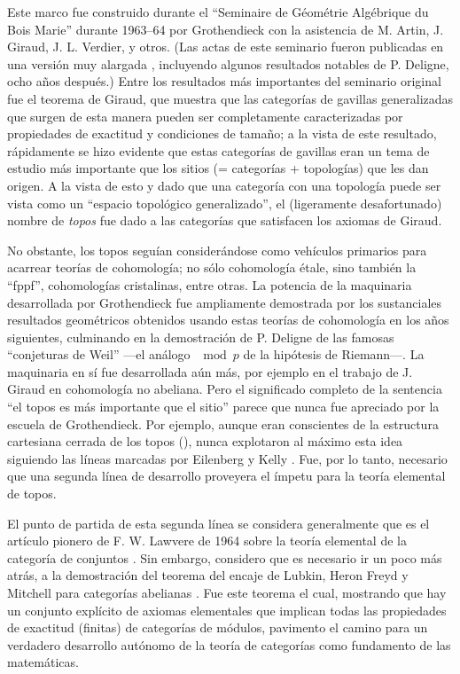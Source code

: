 Este marco fue construido durante el \enquote{Seminaire de Géométrie Algébrique
du Bois Marie} durante 1963--64 por Grothendieck con la asistencia de M. Artin,
J. Giraud, J. L. Verdier, y otros. (Las actas de este seminario fueron
publicadas en una versión muy alargada \pend{[GV]}, incluyendo algunos
resultados notables de P. Deligne, ocho años después.) Entre los resultados más
importantes del seminario original fue el teorema de Giraud, que muestra que las
categorías de gavillas generalizadas que surgen de esta manera pueden ser
completamente caracterizadas por propiedades de exactitud y condiciones de
tamaño; a la vista de este resultado, rápidamente se hizo evidente que estas
categorías de gavillas eran un tema de estudio más importante que los sitios (=
categorías + topologías) que les dan origen. A la vista de esto y dado que una
categoría con una topología puede ser vista como un \enquote{espacio topológico
generalizado}, el (ligeramente desafortunado) nombre de \emph{topos} fue dado a
las categorías que satisfacen los axiomas de Giraud.

No obstante, los topos seguían considerándose como vehículos primarios para
acarrear teorías de cohomología; no sólo cohomología étale, sino también la
\enquote{fppf}, cohomologías cristalinas, entre otras. La potencia de la
maquinaria desarrollada por Grothendieck fue ampliamente demostrada por los
sustanciales resultados geométricos obtenidos usando estas teorías de
cohomología en los años siguientes, culminando en la demostración de P. Deligne
\pend{[149]} de las famosas \enquote{conjeturas de Weil} ---el análogo \(\mod p\) de
la hipótesis de Riemann---. La maquinaria en sí fue desarrollada aún más, por
ejemplo en el trabajo de J. Giraud \pend{[38]} en cohomología no abeliana. Pero
el significado completo de la sentencia \enquote{el topos es más importante que
el sitio} parece que nunca fue apreciado por la escuela de Grothendieck. Por
ejemplo, aunque eran conscientes de la estructura cartesiana cerrada de los
topos (\pend{[GV, IV 10]}), nunca explotaron al máximo esta idea siguiendo las líneas
marcadas por Eilenberg y Kelly \pend{[160]}. Fue, por lo tanto, necesario que una
segunda línea de desarrollo proveyera el ímpetu para la teoría elemental de
topos.

El punto de partida de esta segunda línea se considera generalmente que es el
artículo pionero de F. W. Lawvere de 1964 sobre la teoría elemental de la
categoría de conjuntos \pend{[71]}. Sin embargo, considero que es necesario ir
un poco más atrás, a la demostración del teorema del encaje de Lubkin, Heron
Freyd y Mitchell para categorías abelianas \pend{[AC]}. Fue este teorema el
cual, mostrando que hay un conjunto explícito de axiomas elementales que
implican todas las propiedades de exactitud (finitas) de categorías de módulos,
pavimento el camino para un verdadero desarrollo autónomo de la teoría de
categorías como fundamento de las matemáticas.

